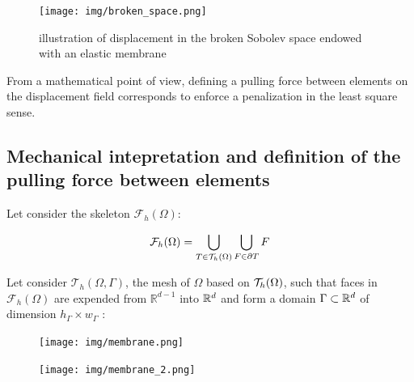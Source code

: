 \documentclass[fleqn]{article}
\begin{document}
            \begin{figure}[h]
                \centering
                \texttt{[image: img/broken\_space.png]}
                \caption{illustration of displacement in the broken Sobolev space endowed with an elastic membrane}
                \label{fig_broken_sapce1}
            \end{figure}

            From a mathematical point of view, defining a pulling force between elements on the displacement field corresponds to enforce a penalization in the least square sense.



    \newpage

    \subsection{Mechanical intepretation and definition of the pulling force between elements}
        
        Let consider the skeleton $\mathcal{F}_h(\Omega)$:

        \begin{equation*}
            \mathcal{F}_h(\Omega) = \bigcup_{T \in \mathcal{T}_h(\Omega)} \bigcup_{F \in \partial T} F
        \end{equation*}

        Let consider $\mathcal{T}_h(\Omega, \Gamma)$, the mesh of $\Omega$ based on $\mathcal{T}_h(\Omega)$, such that faces in $\mathcal{F}_h(\Omega)$ are expended from $\mathbb{R}^{d-1}$ into $\mathbb{R}^d$ and form a domain $\Gamma \subset \mathbb{R}^d$ of dimension $h_\Gamma \times w_\Gamma$ :

        \begin{figure}
        \centering
        \begin{minipage}{.5\textwidth}
            \centering
            \texttt{[image: img/membrane.png]}
            \label{fig_test1}
        \end{minipage}
        \begin{minipage}{.5\textwidth}
            \centering
            \texttt{[image: img/membrane\_2.png]}
            \label{fig_test2}
        \end{minipage}
        \end{figure}
\end{document}
